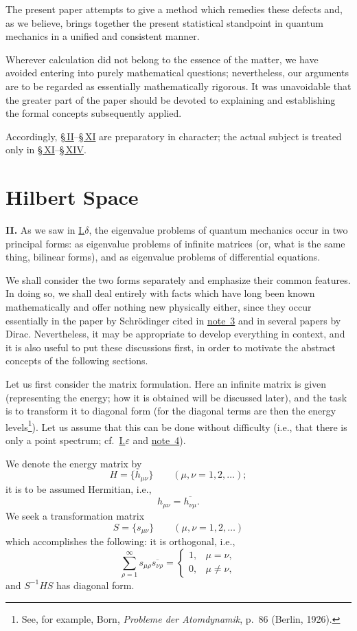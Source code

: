 \documentclass[fontsize=13pt,paper=b5,twoside,bookmarkpackage=false]{scrartcl}
\makeatletter
\newcommand{\majorheading}[2]{%
  \section*{#1}\label{heading:#2}%
  \Hy@writebookmark{}{#1}{\@currentHref}{0}{toc}}
\newcommand{\articleSection}[1]{%
  \par\addvspace{\medskipamount}\phantomsection\label{sec:#1}%
  \pdfbookmark[1]{Section #1}{section-#1}%
  \noindent\textbf{#1.}\enspace\ignorespaces}
\newcommand{\Sec}[1]{\hyperref[sec:#1]{\S\,#1}}
\newcommand{\fnref}[1]{\hyperref[fn:#1]{note~#1}}
\makeatother
\begin{document}
The present paper attempts to give a method which remedies these defects and, as we believe, brings together the present statistical standpoint in quantum mechanics in a unified and consistent manner.

Wherever calculation did not belong to the essence of the matter, we have avoided entering into purely mathematical questions; nevertheless, our arguments are to be regarded as essentially mathematically rigorous. It was unavoidable that the greater part of the paper should be devoted to explaining and establishing the formal concepts subsequently applied.

Accordingly, \Sec{II}--\Sec{XI} are preparatory in character; the actual subject is treated only in \Sec{XI}--\Sec{XIV}.

\majorheading{Hilbert Space}{hilbert-space}
\articleSection{II}
As we saw in \hyperref[sec:I]{I.$\delta$}, the eigenvalue problems of quantum mechanics occur in two principal forms: as eigenvalue problems of infinite matrices (or, what is the same thing, bilinear forms), and as eigenvalue problems of differential equations.

We shall consider the two forms separately and emphasize their common features. In doing so, we shall deal entirely with facts which have long been known mathematically and offer nothing new physically either, since they occur essentially in the paper by Schrödinger cited in \fnref{3} and in several papers by Dirac. Nevertheless, it may be appropriate to develop everything in context, and it is also useful to put these discussions first, in order to motivate the abstract concepts of the following sections.

Let us first consider the matrix formulation. Here an infinite matrix is given (representing the energy; how it is obtained will be discussed later), and the task is to transform it to diagonal form (for the diagonal terms are then the energy levels\footnote[9]{\label{fn:9}See, for example, Born, \emph{Probleme der Atomdynamik}, p.~86 (Berlin, 1926).}). Let us assume that this can be done without difficulty (i.e., that there is only a point spectrum; cf.\ \hyperref[sec:I]{I.$\varepsilon$} and \fnref{4}).

We denote the energy matrix by
\[
H=\{h_{\mu\nu}\}\qquad(\mu,\nu=1,2,\ldots);
\]
it is to be assumed Hermitian, i.e.,
\[
h_{\mu\nu}=\overline{h_{\nu\mu}}.
\]
We seek a transformation matrix
\[
S=\{s_{\mu\nu}\}\qquad(\mu,\nu=1,2,\ldots)
\]
which accomplishes the following: it is orthogonal, i.e.,
\[
\sum_{\rho=1}^{\infty}s_{\mu\rho}\overline{s_{\nu\rho}}
=\begin{cases}1,&\mu=\nu,\\0,&\mu\ne\nu,\end{cases}
\]
and $S^{-1}HS$ has diagonal form.
\end{document}
